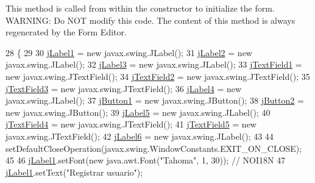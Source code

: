 This method is called from within the constructor to initialize the form. W\+A\+R\+N\+I\+NG\+: Do N\+OT modify this code. The content of this method is always regenerated by the Form Editor. 
\begin{DoxyCode}
28                                   \{
29 
30         \mbox{\hyperlink{classsoftware_1_1registrar_a110efbfc5ad3341638ea3ee89aa6f204}{jLabel1}} = \textcolor{keyword}{new} javax.swing.JLabel();
31         \mbox{\hyperlink{classsoftware_1_1registrar_a24b0c3144951c1a694a839a57632b467}{jLabel2}} = \textcolor{keyword}{new} javax.swing.JLabel();
32         \mbox{\hyperlink{classsoftware_1_1registrar_ab18af739a7842cf44586f9f1ccf4cb5d}{jLabel3}} = \textcolor{keyword}{new} javax.swing.JLabel();
33         \mbox{\hyperlink{classsoftware_1_1registrar_a530c642d7e5cc327ce37e22d77ae4172}{jTextField1}} = \textcolor{keyword}{new} javax.swing.JTextField();
34         \mbox{\hyperlink{classsoftware_1_1registrar_a3270231d8e402db892c290279dcdb893}{jTextField2}} = \textcolor{keyword}{new} javax.swing.JTextField();
35         \mbox{\hyperlink{classsoftware_1_1registrar_ac033f6f71314c40dbfb8d1925cc363f5}{jTextField3}} = \textcolor{keyword}{new} javax.swing.JTextField();
36         \mbox{\hyperlink{classsoftware_1_1registrar_a1cc93efa5caf9078801eef6056e86867}{jLabel4}} = \textcolor{keyword}{new} javax.swing.JLabel();
37         \mbox{\hyperlink{classsoftware_1_1registrar_aef5c4d6cf5be63bd07f311ce4f590faf}{jButton1}} = \textcolor{keyword}{new} javax.swing.JButton();
38         \mbox{\hyperlink{classsoftware_1_1registrar_aad55bb3040eec6aa4685c2641dbff85b}{jButton2}} = \textcolor{keyword}{new} javax.swing.JButton();
39         \mbox{\hyperlink{classsoftware_1_1registrar_a8155b7123176cb4088549ac2325f25f4}{jLabel5}} = \textcolor{keyword}{new} javax.swing.JLabel();
40         \mbox{\hyperlink{classsoftware_1_1registrar_a439caf9553404d6b620bd02d9dd6c644}{jTextField4}} = \textcolor{keyword}{new} javax.swing.JTextField();
41         \mbox{\hyperlink{classsoftware_1_1registrar_a02ef72d4de1e5346b47314c18049f0ba}{jTextField5}} = \textcolor{keyword}{new} javax.swing.JTextField();
42         \mbox{\hyperlink{classsoftware_1_1registrar_a613b33aab588faff234599788161a0aa}{jLabel6}} = \textcolor{keyword}{new} javax.swing.JLabel();
43 
44         setDefaultCloseOperation(javax.swing.WindowConstants.EXIT\_ON\_CLOSE);
45 
46         \mbox{\hyperlink{classsoftware_1_1registrar_a110efbfc5ad3341638ea3ee89aa6f204}{jLabel1}}.setFont(\textcolor{keyword}{new} java.awt.Font(\textcolor{stringliteral}{"Tahoma"}, 1, 30)); \textcolor{comment}{// NOI18N}
47         \mbox{\hyperlink{classsoftware_1_1registrar_a110efbfc5ad3341638ea3ee89aa6f204}{jLabel1}}.setText(\textcolor{stringliteral}{"Registrar usuario"});

\end{DoxyCode}

